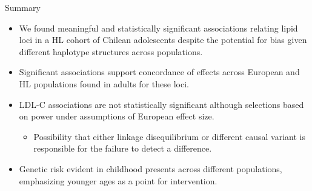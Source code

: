 \documentclass[pdf]{beamer}\usepackage[]{graphicx}\usepackage[]{color}
\begin{document}
\begin{frame}{Summary}
        
          \begin{itemize}
            \item We found meaningful and statistically significant associations relating lipid loci in a HL cohort of Chilean adolescents despite the potential for bias given different haplotype structures across populations.

              \item Significant associations support concordance of effects across European and HL populations found in adults for these loci.
                \item  LDL-C associations are not statistically significant although selections based on power under assumptions of European effect size.
                \begin{itemize} 
                  \item Possibility that either linkage disequilibrium or different causal variant is responsible for the failure to detect a difference.
                \end{itemize}

    \item Genetic risk evident in childhood presents across different populations, emphasizing younger ages as a point for intervention.
            \end{itemize}
  \end{frame}
\end{document}
